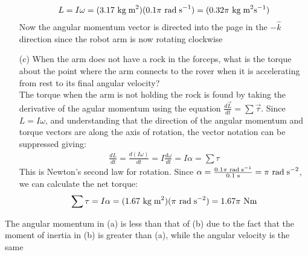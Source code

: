 \documentclass[a4paper]{article}
\newcommand\der[2]{\frac{d #1}{d #2}}
\newcommand\rads{\text{ rad\;s}^{-1}}
\newcommand\radss{\text{ rad\;s}^{-2}}
\newcommand\s{\text{ s}}
\newcommand\Nm{\text{ Nm}}
\newcommand\kgmm{\text{ kg\;m}^{2}}
\newcommand\kgmms{\text{ kg\;m}^2\text{s}^{-1}}
\begin{document}
\begin{shaded}
\begin{enumerate}
\begin{align*}
            L = I\omega = (3.17\kgmm)(0.1\pi\rads) = (0.32\pi\kgmms)
        \end{align*}
        Now the angular momentum vector is directed into the page in the $-\hat{k}$ direction since the robot arm is now rotating clockwise
        \item[(c)] When the arm does not have a rock in the forceps, what is the torque about the point where the arm connects to the rover when it is accelerating from rest to its final angular velocity?\\
        The torque when the arm is not holding the rock is found by taking the derivative of the agular momentum using the equation $\der{\vec{L}}{t} = \sum\vec{\tau}$. Since $L = I\omega$, and understanding that the direction of the angular momentum and torque vectors are along the axis of rotation, the vector notation can be suppressed giving:
        \begin{align*}
            \der{L}{t} = \der{(I\omega)}{t} = I\der{\omega}{t} = I\alpha = \sum\tau
        \end{align*}
        This is Newton's second law for rotation. Since $\alpha = \frac{0.1\pi\rads}{0.1\s} = \pi\radss$, we can calculate the net torque:
        \begin{align*}
            \sum\tau = I\alpha = (1.67\kgmm)(\pi\radss) = 1.67\pi\Nm
        \end{align*}
    \end{enumerate}
    The angular momentum in (a) is less than that of (b) due to the fact that the moment of inertia in (b) is greater than (a), while the angular velocity is the same
\end{shaded} 
\end{document}
